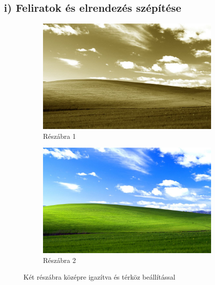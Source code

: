 \documentclass[a4paper,12pt]{article}
\begin{document}
\subsection{i) Feliratok és elrendezés szépítése}
\begin{figure}[h]
    \centering
    \begin{subfigure}{0.4\textwidth}
        \centering
        \includegraphics[width=\linewidth]{szepia.jpg}
        \caption{Részábra 1}
        \label{subfig1}
    \end{subfigure}\hfill
    \begin{subfigure}{0.4\textwidth}
        \centering
        \includegraphics[width=\linewidth]{szines.jpg}
        \caption{Részábra 2}
        \label{subfig2}
    \end{subfigure}
    \caption{Két részábra középre igazítva és térköz beállítással}
    \label{fig:aligned_fig}
\end{figure}
\end{document}

